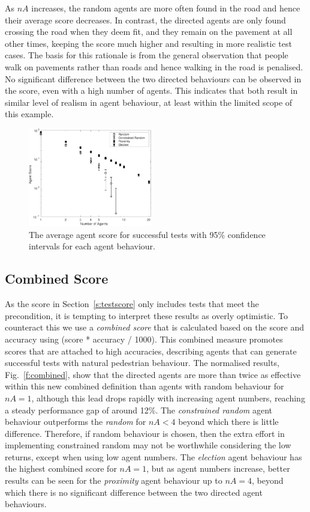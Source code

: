 \documentclass[letterpaper, 10 pt, journal, twoside]{IEEEtran}
\begin{document}
As $nA$ increases, the random agents are more often found in the road and hence their average score decreases. In contrast, the directed agents are only found crossing the road when they deem fit, and they remain on the pavement at all other times, keeping the score much higher and resulting in more realistic test cases. The basis for this rationale is from the general observation that people walk on pavements rather than roads and hence walking in the road is penalised. No significant difference between the two directed behaviours can be observed in the score, even with a high number of agents. This indicates that  both result in similar level of realism in agent behaviour, at least within the limited scope of this example.

\begin{figure}[!t]
	\centering
\includegraphics[width=0.48\textwidth]{AgentScore.pdf}
	\caption{The average agent score for successful tests with 95\% confidence intervals for each agent behaviour.}
	\label{f:agentscore}
\end{figure}

\subsection{Combined Score}
As the score in Section~\ref{s:testscore} only includes tests that meet the precondition, it is tempting to interpret these results as overly optimistic. To counteract this we use a \textit{combined score} that is calculated based on the score and accuracy using (score * accuracy / 1000). This combined measure promotes scores that are attached to high accuracies, describing agents that can generate successful tests with natural pedestrian behaviour. The normalised results, Fig.~\ref{f:combined}, show that the directed agents are more than twice as effective within this new combined definition than agents with random behaviour for $nA=1$, although this lead drops rapidly with increasing agent numbers, reaching a steady performance gap of around 12\%. The \textit{constrained random} agent behaviour outperforms the \textit{random} for $nA<4$ beyond which there is little difference. Therefore, if random behaviour is chosen, then the extra effort in implementing constrained random may not be worthwhile considering the low returns, except when using low agent numbers. The \textit{election} agent behaviour has the highest combined score for $nA=1$, but as agent numbers increase, better results can be seen for the \textit{proximity} agent behaviour up to $nA=4$, beyond which there is no significant difference between the two directed agent behaviours.
\end{document}
